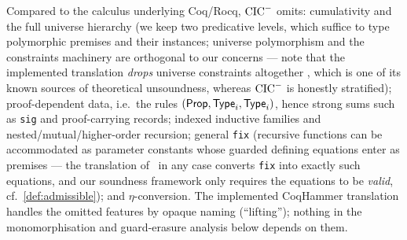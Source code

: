 \begin{remark}
\label{rem:fragment}
Compared to the calculus underlying Coq/Rocq, $\mathrm{CIC}^{-}$ omits:
cumulativity and the full universe hierarchy (we keep two predicative
levels, which suffice to type polymorphic premises and their
instances; universe polymorphism and the constraints machinery are
orthogonal to our concerns --- note that the implemented translation
\emph{drops} universe constraints altogether
\cite[\S3]{CzajkaKaliszyk2018}, which is one of its known sources of
theoretical unsoundness, whereas $\mathrm{CIC}^{-}$ is honestly stratified);
proof-dependent data, i.e.\ the rules $(\mathsf{Prop}, \mathsf{Type}_i,
\mathsf{Type}_i)$, hence strong sums such as \texttt{sig} and
proof-carrying records; indexed inductive families and
nested/mutual/higher-order recursion; general \texttt{fix} (recursive
functions can be accommodated as parameter constants whose guarded
defining equations enter as premises --- the translation
of~\cite{CzajkaKaliszyk2018} in any case converts \texttt{fix} into
exactly such equations, and our soundness framework only requires the
equations to be \emph{valid}, cf.\ \cref{def:admissible}); and
$\eta$-conversion.  The implemented CoqHammer translation handles the
omitted features by opaque naming (``lifting''); nothing in the
monomorphisation and guard-erasure analysis below depends on them.
\end{remark}
